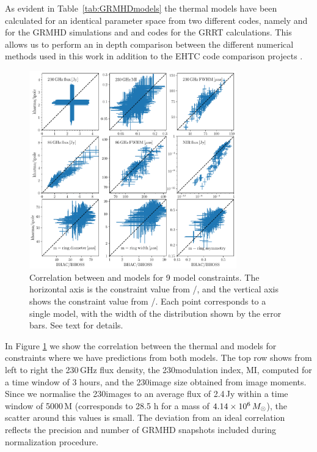 As evident in Table~\ref{tab:GRMHDmodels} the thermal models have been calculated for an identical parameter space from two different codes, namely \kharma and \bhac for the GRMHD simulations and \ipole and \bhoss codes for the GRRT calculations.
This allows us to perform an in depth comparison between the different numerical methods used in this work in addition to the EHTC code comparison projects \citep{2019ApJS..243...26P,2020ApJ...897..148G}.

\begin{figure}
  \centering
  \includegraphics[width=0.8\textwidth]{./figures/BHAC_iharm_correlationNew}
  \caption{Correlation between \bhac and \kharma models for 9 model constraints.
The horizontal axis is the constraint value from \bhac/\bhoss, and the vertical axis shows the constraint value from \kharma/\ipole.
Each point corresponds to a single model, with the width of the distribution shown by the error bars.
See text for details.}
  \label{fig:modelcorrelation}
\end{figure}

In Figure \ref{fig:modelcorrelation} we show the correlation between the thermal \kharma and \bhac models for constraints where we have predictions from both models.
The top row shows from left to right the 230\,GHz flux density, the 230\GHz modulation index, MI, computed for a time window of 3 hours, and the 230\GHz image size obtained from image moments.
Since we normalise the 230\GHz images to an average flux of 2.4\,Jy within a time window of 5000\,M (corresponds to 28.5 h for \sgra a mass of $4.14\times 10^6\,M_\odot$), the scatter around this values is small.
The deviation from an ideal correlation reflects the precision and number of GRMHD snapshots included during normalization procedure.

